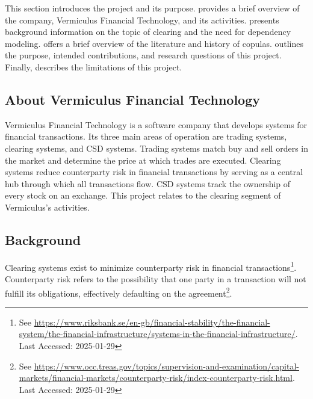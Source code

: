 This section introduces the project and its purpose.  provides a brief overview of the company, Vermiculus Financial Technology, and its activities.  presents background information on the topic of clearing and the need for dependency modeling.  offers a brief overview of the literature and history of copulas.  outlines the purpose, intended contributions, and research questions of this project. Finally,  describes the limitations of this project.

\subsection{About Vermiculus Financial Technology} \label{AboutVFT}
Vermiculus Financial Technology is a software company that develops systems for financial transactions. Its three main areas of operation are trading systems, clearing systems, and \gls{CSD} systems. Trading systems match buy and sell orders in the market and determine the price at which trades are executed. Clearing systems reduce counterparty risk in financial transactions by serving as a central hub through which all transactions flow. \gls{CSD} systems track the ownership of every stock on an exchange. This project relates to the clearing segment of Vermiculus’s activities.

\subsection{Background}\label{Background}
Clearing systems exist to minimize counterparty risk in financial transactions\footnote{See \url{https://www.riksbank.se/en-gb/financial-stability/the-financial-system/the-financial-infrastructure/systems-in-the-financial-infrastructure/}. Last Accessed: 2025-01-29}. Counterparty risk refers to the possibility that one party in a transaction will not fulfill its obligations, effectively defaulting on the agreement\footnote{See \url{https://www.occ.treas.gov/topics/supervision-and-examination/capital-markets/financial-markets/counterparty-risk/index-counterparty-risk.html}. Last Accessed: 2025-01-29}. 

